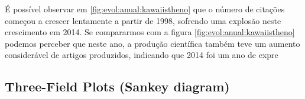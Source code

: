 É possível observar em \ref{fig:evol:anual:kawaiistheno} que o número de citações começou a crescer lentamente a partir de 1998, sofrendo uma explosão neste crescimento em 2014. Se compararmos com a figura \ref{fig:evol:anual:kawaiistheno} podemos perceber que neste ano, a produção científica também teve um aumento considerável de artigos produzidos, indicando que 2014 foi um ano de expre

\subsection{Three-Field Plots (Sankey diagram)}